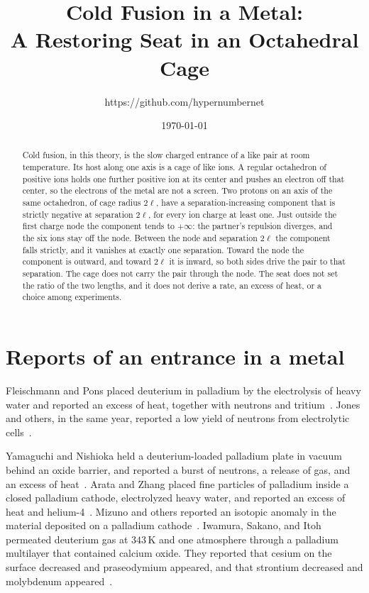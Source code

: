 \documentclass[a4paper]{article}
\title{Cold Fusion in a Metal:\\
A Restoring Seat in an Octahedral Cage}
\author{https://github.com/hypernumbernet}
\date{\today}
\begin{document}
\maketitle

\begin{abstract}
Cold fusion, in this theory, is the slow charged entrance of a like pair at room temperature. Its host along one axis is a cage of like ions. A regular octahedron of positive ions holds one further positive ion at its center and pushes an electron off that center, so the electrons of the metal are not a screen. Two protons on an axis of the same octahedron, of cage radius \(2\ell\), have a separation-increasing component that is strictly negative at separation \(2\ell\), for every ion charge at least one. Just outside the first charge node the component tends to \(+\infty\): the partner's repulsion diverges, and the six ions stay off the node. Between the node and separation \(2\ell\) the component falls strictly, and it vanishes at exactly one separation. Toward the node the component is outward, and toward \(2\ell\) it is inward, so both sides drive the pair to that separation. The cage does not carry the pair through the node. The seat does not set the ratio of the two lengths, and it does not derive a rate, an excess of heat, or a choice among experiments.
\end{abstract}

\section{Reports of an entrance in a metal}
\label{sec:reports}

Fleischmann and Pons placed deuterium in palladium by the electrolysis of heavy water and reported an excess of heat, together with neutrons and tritium~\cite{fleischmann1989}. Jones and others, in the same year, reported a low yield of neutrons from electrolytic cells~\cite{jones1989}.

Yamaguchi and Nishioka held a deuterium-loaded palladium plate in vacuum behind an oxide barrier, and reported a burst of neutrons, a release of gas, and an excess of heat~\cite{yamaguchi1990}. Arata and Zhang placed fine particles of palladium inside a closed palladium cathode, electrolyzed heavy water, and reported an excess of heat and helium-4~\cite{arata1999}. Mizuno and others reported an isotopic anomaly in the material deposited on a palladium cathode~\cite{mizuno1996}. Iwamura, Sakano, and Itoh permeated deuterium gas at \(343\,\mathrm{K}\) and one atmosphere through a palladium multilayer that contained calcium oxide. They reported that cesium on the surface decreased and praseodymium appeared, and that strontium decreased and molybdenum appeared~\cite{iwamura2002}.
\end{document}
